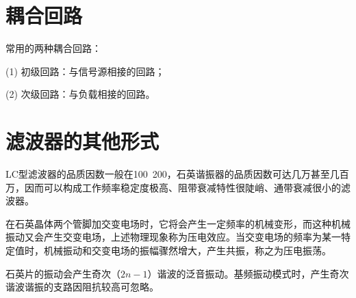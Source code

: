 \section{耦合回路}

常用的两种耦合回路：

(1) 初级回路：与信号源相接的回路；

(2) 次级回路：与负载相接的回路。

\section{滤波器的其他形式}

LC型滤波器的品质因数一般在100~200，石英谐振器的品质因数可达几万甚至几百万，因而可以构成工作频率稳定度极高、阻带衰减特性很陡峭、通带衰减很小的滤波器。

在石英晶体两个管脚加交变电场时，它将会产生一定频率的机械变形，而这种机械振动又会产生交变电场，上述物理现象称为压电效应。当交变电场的频率为某一特定值时，机械振动和交变电场的振幅骤然增大，产生共振，称之为压电振荡。

石英片的振动会产生奇次（$2n-1$）谐波的泛音振动。基频振动模式时，产生奇次谐波谐振的支路因阻抗较高可忽略。

